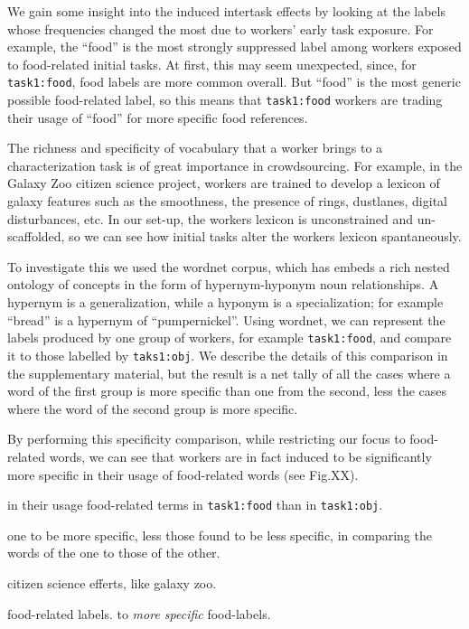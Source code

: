 \documentclass[12pt]{article}
\begin{document}
We gain some insight into the induced intertask effects by looking at the
labels whose frequencies changed the most due to workers' early task exposure. 
For example, the ``food'' is the most strongly suppressed label among 
workers exposed to food-related initial tasks.  At first, this may seem 
unexpected, since, for \texttt{task1:food}, food labels are more common 
overall.  But ``food'' is the most generic possible food-related label, 
so this means that \texttt{task1:food} workers are trading their usage of
``food'' for more specific food references.

The richness and specificity of vocabulary that a worker brings to a 
characterization task is of great importance in crowdsourcing.  For example,
in the Galaxy Zoo citizen science project, workers are 
trained to develop a lexicon of galaxy features such as the smoothness,
the presence of rings, dustlanes, digital disturbances, etc.  In our set-up,
the workers lexicon is unconstrained and un-scaffolded, so we can see 
how initial tasks alter the workers lexicon spantaneously.

To investigate this we used the wordnet corpus, which has embeds a rich
nested ontology of concepts in the form of hypernym-hyponym noun relationships.
A hypernym is a generalization, while a hyponym is a specialization; for 
example ``bread'' is a hypernym of ``pumpernickel''.  Using wordnet, we 
can represent the labels produced by one group of workers, for example 
\texttt{task1:food}, and compare it to those labelled by \texttt{taks1:obj}.
We describe the details of this comparison in the supplementary material,
but the result is a net tally of all the cases where a word of the first 
group is more specific than one from the second, less the cases where the 
word of the second group is more specific.

By performing this specificity comparison, while restricting our focus to
food-related words, we can see that workers are in fact induced to be 
significantly more specific in their usage of food-related words (see Fig.XX).


in their usage 
food-related terms in \texttt{task1:food}
than in \texttt{task1:obj}.


one 
to be more specific, less those found to be less specific, in comparing the 
words of the one to those of the other.



citizen science efferts, like galaxy zoo.

food-related labels.
to \textit{more specific} food-labels.
\end{document}
